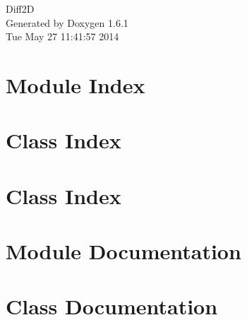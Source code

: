 \documentclass[a4paper]{book}
\begin{document}
\hypersetup{pageanchor=false}
\begin{titlepage}
\vspace*{7cm}
\begin{center}
{\Large Diff2D }\\
\vspace*{1cm}
{\large Generated by Doxygen 1.6.1}\\
\vspace*{0.5cm}
{\small Tue May 27 11:41:57 2014}\\
\end{center}
\end{titlepage}
\clearemptydoublepage
{}
\tableofcontents
\clearemptydoublepage
{}
\hypersetup{pageanchor=true}
\chapter{Module Index}

\chapter{Class Index}

\chapter{Class Index}

\chapter{Module Documentation}

\chapter{Class Documentation}


















\printindex
\end{document}
